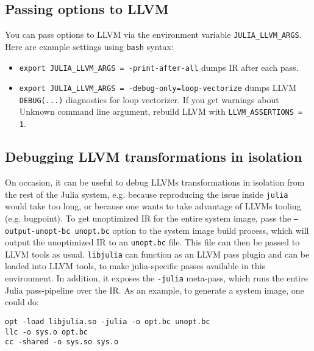 \hypertarget{3429896864083237221}{}


\subsection{Passing options to LLVM}



You can pass options to LLVM via the environment variable \texttt{JULIA\_LLVM\_ARGS}. Here are example settings using \texttt{bash} syntax:



\begin{itemize}
\item \texttt{export JULIA\_LLVM\_ARGS = -print-after-all} dumps IR after each pass.


\item \texttt{export JULIA\_LLVM\_ARGS = -debug-only=loop-vectorize} dumps LLVM \texttt{DEBUG(...)} diagnostics for loop vectorizer. If you get warnings about {\textquotedbl}Unknown command line argument{\textquotedbl}, rebuild LLVM with \texttt{LLVM\_ASSERTIONS = 1}.

\end{itemize}


\hypertarget{7270369944062365114}{}


\subsection{Debugging LLVM transformations in isolation}



On occasion, it can be useful to debug LLVM{\textquotesingle}s transformations in isolation from the rest of the Julia system, e.g. because reproducing the issue inside \texttt{julia} would take too long, or because one wants to take advantage of LLVM{\textquotesingle}s tooling (e.g. bugpoint). To get unoptimized IR for the entire system image, pass the \texttt{--output-unopt-bc unopt.bc} option to the system image build process, which will output the unoptimized IR to an \texttt{unopt.bc} file. This file can then be passed to LLVM tools as usual. \texttt{libjulia} can function as an LLVM pass plugin and can be loaded into LLVM tools, to make julia-specific passes available in this environment. In addition, it exposes the \texttt{-julia} meta-pass, which runs the entire Julia pass-pipeline over the IR. As an example, to generate a system image, one could do:




\begin{lstlisting}
opt -load libjulia.so -julia -o opt.bc unopt.bc
llc -o sys.o opt.bc
cc -shared -o sys.so sys.o
\end{lstlisting}




